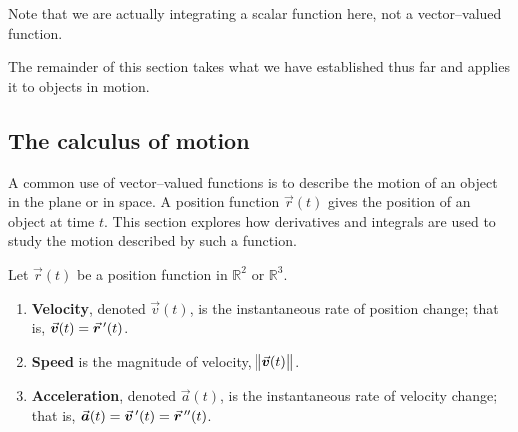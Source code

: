 Note that we are actually integrating a scalar function here, not a vector--valued function.

The remainder of this section takes what we have established thus far and applies it to objects in motion. 

\subsection{The calculus of motion}\label{sec:vvf_motion}

A common use of vector--valued functions is to describe the motion of an object in the plane or in space. A position function $\vec r(t)$ gives the position of an object at time $t$. This section explores how derivatives and integrals are used to study the motion described by such a function.

\begin{definition}\label{def:vvf_motion}
Let $\vec r(t)$ be a position function in $\mathbb{R}^2$ or $\mathbb{R}^3$.
\begin{enumerate}
	\item \textbf{Velocity}, denoted $\vec v(t)$, is the instantaneous rate of position change; that is, $\vec v(t) = \vrp(t)$.
	\item	\textbf{Speed} is the magnitude of velocity, $\norm{\vec v(t)}$.
	\item	\textbf{Acceleration}, denoted $\vec a(t)$, is the instantaneous rate of velocity change; that is, \linebreak$\vec a(t) = \vec v\,'(t) = \vrp'(t)$.
\end{enumerate}
\end{definition}

